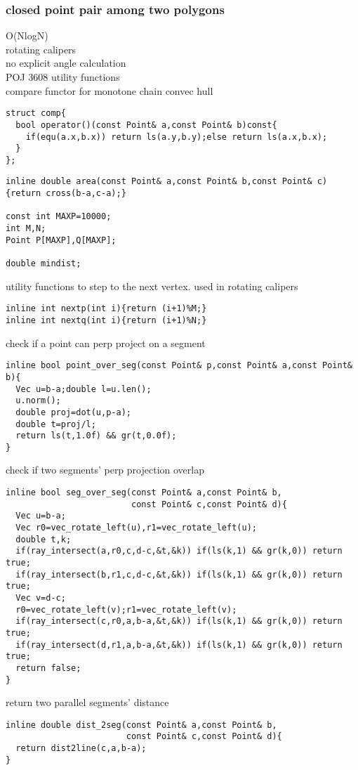 \documentclass[a4paper]{article}
\begin{document}
\subsubsection{closed point pair among two polygons}
O(NlogN) \\
rotating calipers \\
no explicit angle calculation \\
POJ 3608
utility functions \\
compare functor for monotone chain convec hull
\begin{lstlisting}
struct comp{
  bool operator()(const Point& a,const Point& b)const{
    if(equ(a.x,b.x)) return ls(a.y,b.y);else return ls(a.x,b.x);
  }
};
\end{lstlisting}
\begin{lstlisting}
inline double area(const Point& a,const Point& b,const Point& c){return cross(b-a,c-a);}

const int MAXP=10000;
int M,N;
Point P[MAXP],Q[MAXP];

double mindist;
\end{lstlisting}
utility functions to step to the next vertex. used in rotating calipers
\begin{lstlisting}
inline int nextp(int i){return (i+1)%M;}
inline int nextq(int i){return (i+1)%N;}
\end{lstlisting}
check if a point can perp project on a segment
\begin{lstlisting}
inline bool point_over_seg(const Point& p,const Point& a,const Point& b){
  Vec u=b-a;double l=u.len();
  u.norm();
  double proj=dot(u,p-a);
  double t=proj/l;
  return ls(t,1.0f) && gr(t,0.0f);
}
\end{lstlisting}
check if two segments' perp projection overlap
\begin{lstlisting}
inline bool seg_over_seg(const Point& a,const Point& b,
                         const Point& c,const Point& d){
  Vec u=b-a;
  Vec r0=vec_rotate_left(u),r1=vec_rotate_left(u);
  double t,k;
  if(ray_intersect(a,r0,c,d-c,&t,&k)) if(ls(k,1) && gr(k,0)) return true;
  if(ray_intersect(b,r1,c,d-c,&t,&k)) if(ls(k,1) && gr(k,0)) return true;
  Vec v=d-c;
  r0=vec_rotate_left(v);r1=vec_rotate_left(v);
  if(ray_intersect(c,r0,a,b-a,&t,&k)) if(ls(k,1) && gr(k,0)) return true;
  if(ray_intersect(d,r1,a,b-a,&t,&k)) if(ls(k,1) && gr(k,0)) return true;
  return false;
}
\end{lstlisting}
return two parallel segments' distance
\begin{lstlisting}
inline double dist_2seg(const Point& a,const Point& b,
                        const Point& c,const Point& d){
  return dist2line(c,a,b-a);
}
\end{lstlisting}
\end{document}
